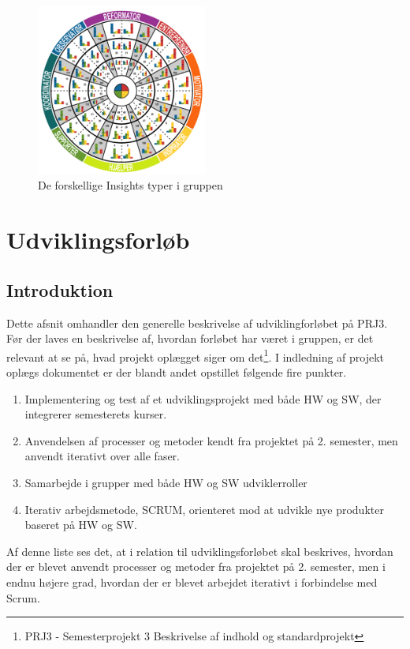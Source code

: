 \documentclass[a4paper,12pt,fleqn,oneside]{article}
\begin{document}
\begin{figure}[H]
    \centering
    \includegraphics[width=0.5\textwidth]{Processdokument/graphics/type_cirkel.png}
    \caption{De forskellige Insights typer i gruppen}
    \label{fig:group_types}
\end{figure}

\section{Udviklingsforløb}
\subsection{Introduktion}
Dette afsnit omhandler den generelle beskrivelse af udviklingforløbet på PRJ3. Før der laves en beskrivelse af, hvordan forløbet har været i gruppen, er det relevant at se på, hvad projekt oplægget siger om det\footnote{PRJ3 - Semesterprojekt 3
Beskrivelse af indhold og standardprojekt}. I indledning af projekt oplægs dokumentet er der blandt andet opstillet følgende fire punkter.
\begin{enumerate}
    \item Implementering og test af et udviklingsprojekt med både HW og SW, der integrerer semesterets kurser.
    \item Anvendelsen af processer og metoder kendt fra projektet på 2. semester, men anvendt iterativt over alle faser.
    \item Samarbejde i grupper med både HW og SW udviklerroller
    \item Iterativ arbejdsmetode, SCRUM, orienteret mod at udvikle nye produkter baseret på HW og SW.
\end{enumerate}
Af denne liste ses det, at i relation til udviklingsforløbet skal beskrives, hvordan der er blevet anvendt processer og metoder fra projektet på 2. semester, men i endnu højere grad, hvordan der er blevet arbejdet iterativt i forbindelse med Scrum.
\end{document}
